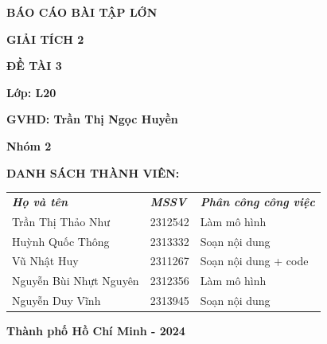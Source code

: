 \documentclass[12pt,a4paper]{article}
\begin{document}
\begin{titlepage}
\begin{center}
    \vspace{10pt}
    \fontsize{18pt}{17pt}\selectfont 
    \textbf{BÁO CÁO BÀI TẬP LỚN} 
    
    \vspace{7pt}
    \textbf{GIẢI TÍCH 2}
\end{center}

\begin{center}
    \fontsize{18pt}{17pt}\selectfont 
    \textbf{\textrm{ĐỀ TÀI 3}}
\end{center}

\begin{center}
    \vspace{15pt}
\textbf{Lớp: L20}
\end{center}

\begin{center}
    \vspace{15pt}
\textbf{GVHD: Trần Thị Ngọc Huyền}
\end{center}

\begin{center}
\vspace{15pt}
\textbf{Nhóm 2}
\end{center}

\vspace{10pt}
\textbf{DANH SÁCH THÀNH VIÊN:}
 \begin{center}
\begin{table}[h!]
    \begin{tabular}{lll}
    \textit{\textbf{Họ và tên}} & \textit{\textbf{MSSV}} & \textit{\textbf{Phân công công việc}} \\
    Trần Thị Thảo Như           & 2312542                & Làm mô hình                           \\
    Huỳnh Quốc Thông            & 2313332                & Soạn nội dung                         \\
    Vũ Nhật Huy                 & 2311267                & Soạn nội dung + code                  \\
    Nguyễn Bùi Nhựt Nguyên      & 2312356                & Làm mô hình                         \\
    Nguyễn Duy Vĩnh             & 2313945                & Soạn nội dung                          
    \end{tabular}
    \end{table}
 \end{center}

\vfill
\centerline{\bf Thành phố Hồ Chí Minh - 2024}

\vspace{1cm}
\end{titlepage}
\end{document}

